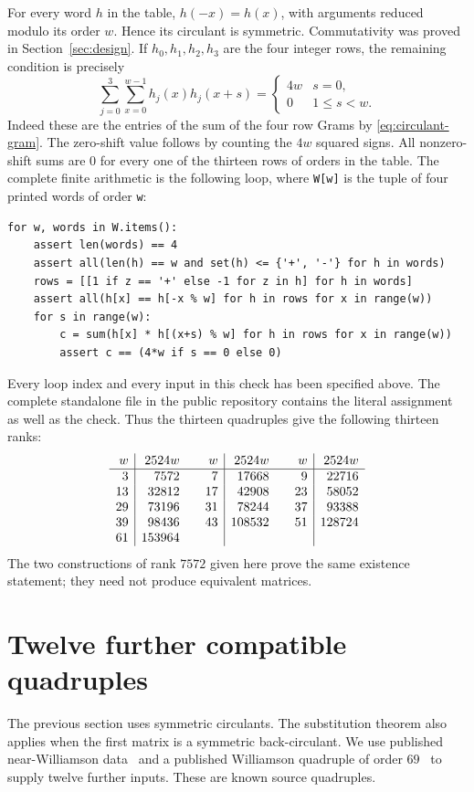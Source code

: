 \documentclass[10pt]{article}
\begin{document}
For every word $h$ in the table, $h(-x)=h(x)$, with arguments reduced
modulo its order $w$. Hence its circulant is symmetric. Commutativity was
proved in Section~\ref{sec:design}. If $h_0,h_1,h_2,h_3$ are the four
integer rows, the remaining condition is precisely
\[
 \sum_{j=0}^3\sum_{x=0}^{w-1}h_j(x)h_j(x+s)
 =\begin{cases}4w&s=0,\\0&1\leq s<w.\end{cases}
\]
Indeed these are the entries of the sum of the four row Grams by
\eqref{eq:circulant-gram}. The zero-shift value follows by counting the
$4w$ squared signs. All nonzero-shift sums are $0$ for every one of the
thirteen rows of orders in the table. The complete finite arithmetic is
the following loop, where \texttt{W[w]} is the tuple of four printed words
of order \texttt{w}:
\begin{verbatim}
for w, words in W.items():
    assert len(words) == 4
    assert all(len(h) == w and set(h) <= {'+', '-'} for h in words)
    rows = [[1 if z == '+' else -1 for z in h] for h in words]
    assert all(h[x] == h[-x % w] for h in rows for x in range(w))
    for s in range(w):
        c = sum(h[x] * h[(x+s) % w] for h in rows for x in range(w))
        assert c == (4*w if s == 0 else 0)
\end{verbatim}
Every loop index and every input in this check has been specified above.
The complete standalone file in the public repository contains the
literal assignment as well as the check.
Thus the thirteen quadruples give the following thirteen ranks:
\[
\begin{array}{r|r@{\qquad}r|r@{\qquad}r|r}
w&2524w&w&2524w&w&2524w\\\hline
3&7572&7&17668&9&22716\\
13&32812&17&42908&23&58052\\
29&73196&31&78244&37&93388\\
39&98436&43&108532&51&128724\\
61&153964&&&&
\end{array}
\]
The two constructions of rank $7572$ given here prove the same existence
statement; they need not produce equivalent matrices.



\section{Twelve further compatible quadruples}\label{sec:additional-quadruples}

The previous section uses symmetric circulants. The substitution theorem
also applies when the first matrix is a symmetric back-circulant. We use
published near-Williamson data~\cite{near-williamson} and a published
Williamson quadruple of order $69$~\cite{williamson69} to supply twelve
further inputs. These are known source quadruples.
\end{document}
